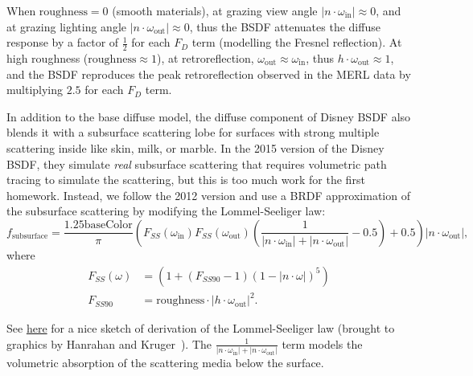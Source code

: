 When $\text{roughness} = 0$ (smooth materials), at grazing view angle $|n \cdot \omega_{\text{in}}| \approx 0$, and at grazing lighting angle $|n \cdot \omega_{\text{out}}| \approx 0$, thus the BSDF attenuates the diffuse response by a factor of $\frac{1}{2}$ for each $F_D$ term (modelling the Fresnel reflection). At high roughness ($\text{roughness} \approx 1$), at retroreflection, $\omega_{\text{out}} \approx \omega_{\text{in}}$, thus $h \cdot \omega_{\text{out}} \approx 1$, and the BSDF reproduces the peak retroreflection observed in the MERL data by multiplying $2.5$ for each $F_D$ term.

In addition to the base diffuse model, the diffuse component of Disney BSDF also blends it with a subsurface scattering lobe for surfaces with strong multiple scattering inside like skin, milk, or marble. In the 2015 version of the Disney BSDF, they simulate \emph{real} subsurface scattering that requires volumetric path tracing to simulate the scattering, but this is too much work for the first homework. Instead, we follow the 2012 version and use a BRDF approximation of the subsurface scattering by modifying the Lommel-Seeliger law:
\begin{equation}
	f_{\text{subsurface}} = \frac{1.25 \text{baseColor}}{\pi} \left(
	F_{SS}(\omega_{\text{in}}) F_{SS}(\omega_{\text{out}}) \left(\frac{1}{|n \cdot \omega_{\text{in}}| + |n \cdot \omega_{\text{out}}|} - 0.5 \right) + 0.5 \right) |n \cdot \omega_{\text{out}}|,
\end{equation} 
where
\begin{equation}
\begin{aligned}
F_{SS}(\omega) &= \left(1 + (F_{SS90} - 1) (1 - |n \cdot \omega|)^5 \right) \\
F_{SS90} &= \text{roughness} \cdot |h \cdot \omega_{\text{out}}|^2.
\end{aligned}
\end{equation}

See \href{https://phys.libretexts.org/Bookshelves/Astronomy__Cosmology/Book%3A_Planetary_Photometry_(Tatum_and_Fairbairn)/03%3A_A_Brief_History_of_the_Lommel-Seeliger_Law/3.01%3A_A_Brief_History_of_the_Lommel-Seeliger_Law#:~:text=Description.,physical%20model%20of%20diffuse%20reflection.&text=Thus%2C%20of%20this%20diffuse%20scattered,emerging%20as%20diffuse%20reflected%20radiation.}{here} for a nice sketch of derivation of the Lommel-Seeliger law (brought to graphics by Hanrahan and Kruger~\cite{Hanrahan:1993:RLS}). The $\frac{1}{|n \cdot \omega_{\text{in}}| + |n \cdot \omega_{\text{out}}|}$ term models the volumetric absorption of the scattering media below the surface.

